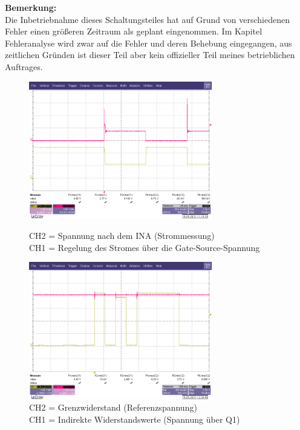 \vspace{1,5cm}
\textbf{Bemerkung:}
\\
Die Inbetriebnahme dieses Schaltungsteiles hat auf Grund von verschiedenen Fehler einen größeren Zeitraum als geplant eingenommen. Im Kapitel Fehleranalyse wird zwar auf die Fehler und deren Behebung eingegangen, aus zeitlichen Gründen ist dieser Teil aber kein offizieller Teil meines betrieblichen Auftrages.


\begin{figure}[htb]
    \centering
    \begin{minipage}[t]{0.45\linewidth}
        \centering
        \includegraphics[width=8cm]{Bilder/INA-Spannung.png}
        \caption{CH2 = Spannung nach dem INA (Strommessung)\\
        			CH1 = Regelung des Stromes über die Gate-Source-Spannung}
    \end{minipage}%
    \hfill
    \begin{minipage}[t]{0.45\linewidth}
        \centering
        \includegraphics[width=8cm]{Bilder/Auswertung-Widerstand.png}
        \caption{CH2 = Grenzwiderstand (Referenzspannung)\\ 
        			CH1 = Indirekte Widerstandswerte (Spannung über Q1)}
    \end{minipage} 
\end{figure}

